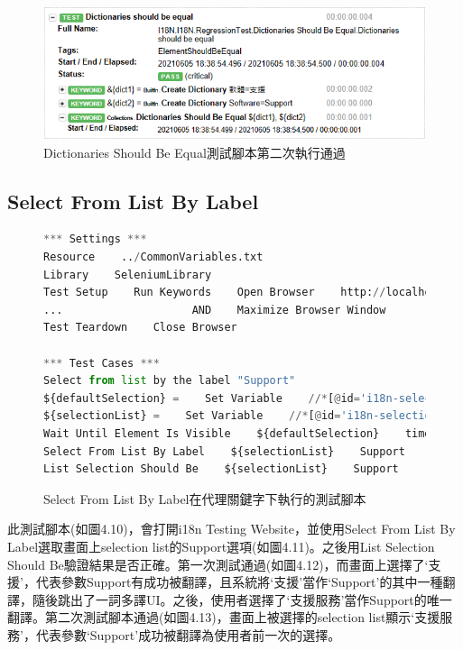 \begin{figure}[H]
\includegraphics[width= \textwidth]{../論文截圖/4.1.3-3 dictionaries should be equal 2nd run.png}
\caption{Dictionaries Should Be Equal測試腳本第二次執行通過}
\end{figure}

\subsection{Select From List By Label}
\begin{figure}[H]
\begin{lstlisting}[language={python}]
*** Settings ***
Resource    ../CommonVariables.txt
Library    SeleniumLibrary
Test Setup    Run Keywords    Open Browser    http://localhost:3000    Chrome
...                    AND    Maximize Browser Window
Test Teardown    Close Browser

*** Test Cases ***
Select from list by the label "Support"
${defaultSelection} =    Set Variable    //*[@id='i18n-selection-list']//*[text()='Software' and @selected]
${selectionList} =    Set Variable    //*[@id='i18n-selection-list']
Wait Until Element Is Visible    ${defaultSelection}    timeout=${shortPeriodOfTime}
Select From List By Label    ${selectionList}    Support
List Selection Should Be    ${selectionList}    Support
\end{lstlisting}
\caption{Select From List By Label在代理關鍵字下執行的測試腳本}
\end{figure}
此測試腳本(如圖4.10)，會打開i18n Testing Website，並使用Select From List By Label選取畫面上selection list的Support選項(如圖4.11)。之後用List Selection Should Be驗證結果是否正確。第一次測試通過(如圖4.12)，而畫面上選擇了‘支援’，代表參數Support有成功被翻譯，且系統將‘支援’當作‘Support’的其中一種翻譯，隨後跳出了一詞多譯UI。之後，使用者選擇了‘支援服務’當作Support的唯一翻譯。第二次測試腳本通過(如圖4.13)，畫面上被選擇的selection list顯示‘支援服務’，代表參數‘Support’成功被翻譯為使用者前一次的選擇。


